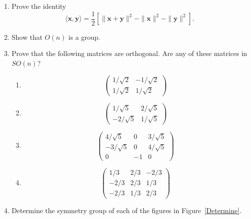  
{\small
\begin{enumerate}
 
 
 
\item
Prove the identity
\[
\langle {\mathbf x}, {\mathbf y} \rangle = \frac{1}{2}
\left[
\|{\mathbf x} + {\mathbf y}\|^2 - \|{\mathbf x}\|^2 - \| {\mathbf y}\|^2
\right].
\]
 
 
\item
Show that $O(n)$ is a group.
 
 
\item
Prove that the following matrices are orthogonal. Are any of
these matrices in $SO(n)$?
\begin{multicols}{2}
\begin{enumerate}

\item
\[
\begin{pmatrix}
1/\sqrt{2} & -1/\sqrt{2} \\
1/\sqrt{2} & 1/\sqrt{2}
\end{pmatrix}
\]

\item
\[
\begin{pmatrix}
1 / \sqrt{5} & 2 / \sqrt{5} \\
- 2 /\sqrt{5} & 1/ \sqrt{5}
\end{pmatrix}
\]

\item
\[
\begin{pmatrix}
4/ \sqrt{5} & 0 & 3 / \sqrt{5} \\
-3 / \sqrt{5} & 0 & 4 / \sqrt{5} \\
0 & -1 & 0
\end{pmatrix}
\] 

\item
\[
\begin{pmatrix}
1/3 & 2/3 & - 2/3 \\
- 2/3 & 2/3 & 1/3 \\
-2/3 & 1/3 & 2/3
\end{pmatrix}
\]


\end{enumerate}
\end{multicols}
 

 
\item %
Determine the symmetry group of each of the figures in
Figure~\ref{Determine}. 
\begin{figure}[htb]

\begin{center}
\begin{tikzpicture}[scale=0.7] %


\end{tikzpicture}
\end{center}
\end{figure}
\end{enumerate}}
